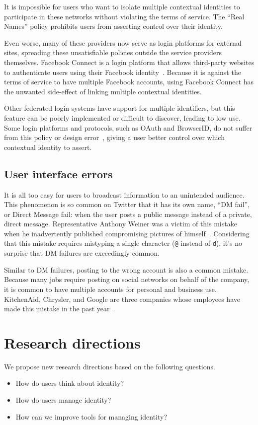 \documentclass[10pt, conference, compsocconf]{IEEEtran}
\begin{document}
It is impossible for users who want to isolate multiple contextual identities
to participate in these networks without violating the terms of service.  The
``Real Names'' policy prohibits users from asserting control over their
identity.

Even worse, many of these providers now serve as login platforms for external
sites, spreading these unsatisfiable policies outside the service providers
themselves.  Facebook Connect is a login platform that allows third-party
websites to authenticate users using their Facebook identity~\cite{fb_connect}.
Because it is against the terms of service to have multiple Facebook accounts,
using Facebook Connect has the unwanted side-effect of linking multiple
contextual identities.

Other federated login systems have support for multiple identifiers, but this
feature can be poorly implemented or difficult to discover, leading to low use.
Some login platforms and protocols, such as OAuth and BrowserID, do not suffer
from this policy or design error~\cite{browserid,oauth}, giving a user better
control over which contextual identity to assert.

\subsection{User interface errors}
It is all too easy for users to broadcast information to
an unintended audience. This phenomenon is so common on Twitter that it has its
own name, ``DM fail'', or Direct Message fail: when the user posts a public
message instead of a private, direct message. Representative Anthony Weiner was
a victim of this mistake when he inadvertently published compromising pictures
of himself~\cite{weiner}. Considering that this mistake requires
mistyping a single character (\texttt{@} instead of \texttt{d}), it's no
surprise that DM failures are exceedingly common.

Similar to DM failures, posting to the wrong account is also a common mistake.
Because many jobs require posting on social networks on behalf of the company,
it is common to have multiple accounts for personal and business use.
KitchenAid, Chrysler, and Google are three companies whose employees have
made this mistake in the past year~\cite{kitchenaid,chrysler,yegge}.

\section{Research directions}
We propose new research directions based on the following questions.
\begin{itemize}
\item How do users think about identity?
\item How do users manage identity?
\item How can we improve tools for managing identity?
\end{itemize}
\end{document}
